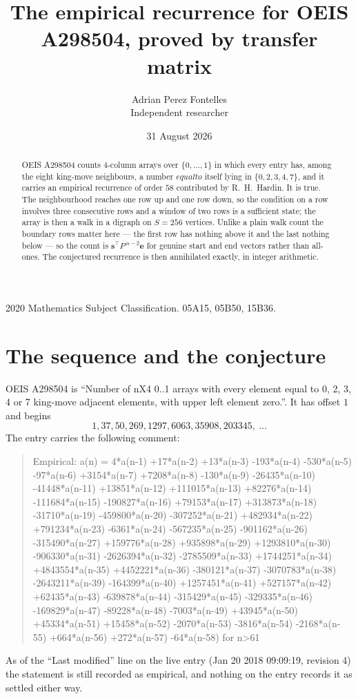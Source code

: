 \documentclass[11pt,a4paper]{article}
\title{The empirical recurrence for OEIS A298504, proved by transfer matrix}
\author{Adrian Perez Fontelles\\ \small Independent researcher}
\date{31 August 2026}
\theoremstyle{plain}
\theoremstyle{definition}
\begin{document}
\maketitle

\begin{abstract}
OEIS A298504 counts $4$-column arrays over $\{0,\dots,1\}$ in which every entry has,
among the eight king-move neighbours, a number $equal to$ itself lying in $\{0,2,3,4,7\}$, and it carries an empirical
recurrence of order $58$ contributed by R.~H.~Hardin. It is true. The neighbourhood
reaches one row up and one row down, so the condition on a row involves three consecutive
rows and a window of two rows is a sufficient state; the array is then a walk in a digraph
on $S=256$ vertices. Unlike a plain walk count the boundary rows matter here --- the first
row has nothing above it and the last nothing below --- so the count is
$\mathbf{s}^{\!\top}P^{\,n-2}\mathbf{e}$ for genuine start and end vectors rather than
all-ones. The conjectured recurrence is then annihilated exactly, in integer arithmetic.
\end{abstract}

\noindent\small 2020 Mathematics Subject Classification. 05A15, 05B50, 15B36.\normalsize

\section{The sequence and the conjecture}

OEIS A298504 is ``Number of nX4 0..1 arrays with every element equal to 0, 2, 3, 4 or 7 king-move adjacent elements, with upper left element zero.''. It has offset
$1$ and begins
\[
1, 37, 50, 269, 1297, 6063, 35908, 203345,\ \dots
\]
The entry carries the following comment:
\begin{quote}\small
Empirical: a(n) = 4*a(n-1) +17*a(n-2) +13*a(n-3) -193*a(n-4) -530*a(n-5) -97*a(n-6) +3154*a(n-7) +7208*a(n-8) -130*a(n-9) -26435*a(n-10) -41448*a(n-11) +13851*a(n-12) +111015*a(n-13) +82276*a(n-14) -111684*a(n-15) -190827*a(n-16) +79153*a(n-17) +313873*a(n-18) -31710*a(n-19) -459800*a(n-20) -307252*a(n-21) +482934*a(n-22) +791234*a(n-23) -6361*a(n-24) -567235*a(n-25) -901162*a(n-26) -315490*a(n-27) +159776*a(n-28) +935898*a(n-29) +1293810*a(n-30) -906330*a(n-31) -2626394*a(n-32) -2785509*a(n-33) +1744251*a(n-34) +4843554*a(n-35) +4452221*a(n-36) -380121*a(n-37) -3070783*a(n-38) -2643211*a(n-39) -164399*a(n-40) +1257451*a(n-41) +527157*a(n-42) +62435*a(n-43) -639878*a(n-44) -315429*a(n-45) -329335*a(n-46) -169829*a(n-47) -89228*a(n-48) -7003*a(n-49) +43945*a(n-50) +45334*a(n-51) +15458*a(n-52) -2070*a(n-53) -3816*a(n-54) -2168*a(n-55) +664*a(n-56) +272*a(n-57) -64*a(n-58) for n>61
\end{quote}
As of the ``Last modified'' line on the live entry (Jan 20 2018 09:09:19, revision
4) the statement is still recorded as empirical, and nothing on the entry
records it as settled either way.
\end{document}
